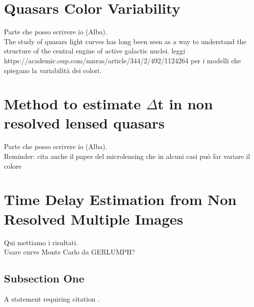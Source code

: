 \documentclass[twoside,twocolumn]{article}
\begin{document}
\section{Quasars Color Variability}
Parte che posso scrivere io (Alba).
\\
The study of quasars light curves has long been seen as a way to understand the structure of the central engine of active galactic nuclei.
leggi https://academic.oup.com/mnras/article/344/2/492/1124264 per i modelli che spiegano la variabilità dei colori.


\section{Method to estimate $\Delta$t in non resolved lensed quasars}
Parte che posso scrivere io (Alba).
\\
Reminder: cita anche il paper del microlensing che in alcuni casi può far variare il colore

\section{Time Delay Estimation from Non Resolved Multiple Images}

Qui mettiamo i risultati.
\\
Usare curve Monte Carlo da GERLUMPH?



\subsection{Subsection One}

A statement requiring citation \cite{Figueredo:2009dg}.



\nocite{*}
\onecolumn{\printbibliography}

\begin{comment}

\begin{thebibliography}{99} %

\bibitem{h0licow_I}
The H0LiCOW Collaboration,
\textit{MNRAS, Volume 468, Issue 3} (2017)

\bibitem{h0licow_XIII}
The H0LiCOW Collaboration,
\textit{MNRAS, stz3094} (2020)

\bibitem{refsdal}
S. Refsdal,
\textit{MNRAS, 128, 307} (1964)

\bibitem{cosmograil}
The COSMOGRAIL Collaboration,
\textit{arXiv:2002.05736v1} (2020)

\bibitem{weinberg_euclid}
D. Weinberg et al.,
\textit{Phys. Rep., 530, 87} (2013)

\end{thebibliography}

\end{comment}

\end{document}
